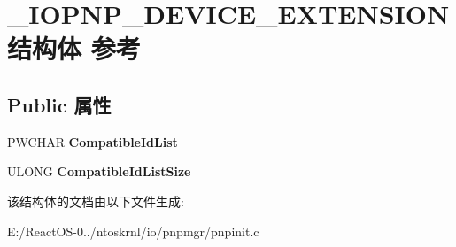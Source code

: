 \hypertarget{struct___i_o_p_n_p___d_e_v_i_c_e___e_x_t_e_n_s_i_o_n}{}\section{\+\_\+\+I\+O\+P\+N\+P\+\_\+\+D\+E\+V\+I\+C\+E\+\_\+\+E\+X\+T\+E\+N\+S\+I\+O\+N结构体 参考}
\label{struct___i_o_p_n_p___d_e_v_i_c_e___e_x_t_e_n_s_i_o_n}
\subsection*{Public 属性}
\begin{DoxyCompactItemize}
\item 
\mbox{\label{struct___i_o_p_n_p___d_e_v_i_c_e___e_x_t_e_n_s_i_o_n_a6d37900422d861968b400df2d8fac26e}} 
P\+W\+C\+H\+AR {\bfseries Compatible\+Id\+List}
\item 
\mbox{\label{struct___i_o_p_n_p___d_e_v_i_c_e___e_x_t_e_n_s_i_o_n_a3d9a579a71e7a757679a3fdb409f3d6c}} 
U\+L\+O\+NG {\bfseries Compatible\+Id\+List\+Size}
\end{DoxyCompactItemize}


该结构体的文档由以下文件生成\+:\begin{DoxyCompactItemize}
\item 
E\+:/\+React\+O\+S-\/0../ntoskrnl/io/pnpmgr/pnpinit.\+c\end{DoxyCompactItemize}
